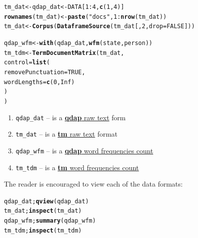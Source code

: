 \documentclass{article}\usepackage[]{graphicx}\usepackage[]{color}
\makeatletter
\newcommand{\hlnum}[1]{\textcolor[rgb]{0.686,0.059,0.569}{#1}}%
\newcommand{\hlstr}[1]{\textcolor[rgb]{0.192,0.494,0.8}{#1}}%
\newcommand{\hlopt}[1]{\textcolor[rgb]{0,0,0}{#1}}%
\newcommand{\hlstd}[1]{\textcolor[rgb]{0.345,0.345,0.345}{#1}}%
\newcommand{\hlkwb}[1]{\textcolor[rgb]{0.69,0.353,0.396}{#1}}%
\newcommand{\hlkwc}[1]{\textcolor[rgb]{0.333,0.667,0.333}{#1}}%
\newcommand{\hlkwd}[1]{\textcolor[rgb]{0.737,0.353,0.396}{\textbf{#1}}}%
\newenvironment{kframe}{%
 \def\at@end@of@kframe{}%
 \ifinner\ifhmode%
  \def\at@end@of@kframe{\end{minipage}}%
  \begin{minipage}{\columnwidth}%
 \fi\fi%
 \def\FrameCommand##1{\hskip\@totalleftmargin \hskip-\fboxsep
 \colorbox{shadecolor}{##1}\hskip-\fboxsep
     \hskip-\linewidth \hskip-\@totalleftmargin \hskip\columnwidth}%
 \MakeFramed {\advance\hsize-\width
   \@totalleftmargin\z@ \linewidth\hsize
   \@setminipage}}%
 {\par\unskip\endMakeFramed%
 \at@end@of@kframe}
\newenvironment{knitrout}{}{} %
\makeatother
\begin{document}
\begin{knitrout}
\color{fgcolor}\begin{kframe}
\begin{alltt}
\hlstd{tm_dat} \hlkwb{<-} \hlstd{qdap_dat} \hlkwb{<-} \hlstd{DATA[}\hlnum{1}\hlopt{:}\hlnum{4}\hlstd{,} \hlkwd{c} \hlstd{(}\hlnum{1}\hlstd{,} \hlnum{4}\hlstd{) ]}
\hlkwd{rownames} \hlstd{(tm_dat)} \hlkwb{<-} \hlkwd{paste} \hlstd{(}\hlstr{"docs"}\hlstd{,} \hlnum{1}\hlopt{:} \hlkwd{nrow} \hlstd{(tm_dat))}
\hlstd{tm_dat} \hlkwb{<-} \hlkwd{Corpus} \hlstd{(} \hlkwd{DataframeSource} \hlstd{(tm_dat[,} \hlnum{2}\hlstd{,} \hlkwc{drop}\hlstd{=}\hlnum{FALSE}\hlstd{]))}

\hlstd{qdap_wfm} \hlkwb{<-} \hlkwd{with} \hlstd{(qdap_dat,} \hlkwd{wfm} \hlstd{(state, person))}
\hlstd{tm_tdm} \hlkwb{<-} \hlkwd{TermDocumentMatrix} \hlstd{(tm_dat,}
    \hlkwc{control} \hlstd{=} \hlkwd{list} \hlstd{(}
        \hlkwc{removePunctuation} \hlstd{=} \hlnum{TRUE}\hlstd{,}
        \hlkwc{wordLengths}\hlstd{=} \hlkwd{c} \hlstd{(}\hlnum{0}\hlstd{,} \hlnum{Inf}\hlstd{)}
    \hlstd{)}
\hlstd{)}
\end{alltt}
\end{kframe}
\end{knitrout}


\begin{enumerate}
  \item \texttt{qdap\_dat} -- is a \underline{\textbf{qdap} raw text} form
  \item \texttt{tm\_dat} -- is a \underline{\textbf{tm} raw text} format
  \item \texttt{qdap\_wfm} -- is a \underline{\textbf{qdap} word frequencies count}
  \item \texttt{tm\_tdm} -- is a \underline{\textbf{tm} word frequencies count}
\end{enumerate}

\noindent The reader is encouraged to view each of the data formats:

\begin{knitrout}
\color{fgcolor}\begin{kframe}
\begin{alltt}
\hlstd{qdap_dat;} \hlkwd{qview}\hlstd{(qdap_dat)}
\hlstd{tm_dat;} \hlkwd{inspect}\hlstd{(tm_dat)}
\hlstd{qdap_wfm;} \hlkwd{summary}\hlstd{(qdap_wfm)}
\hlstd{tm_tdm;} \hlkwd{inspect}\hlstd{(tm_tdm)}
\end{alltt}
\end{kframe}
\end{knitrout}
\end{document}
